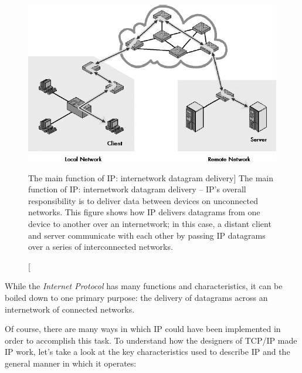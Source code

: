 \begin{figure}
   \centering
   \includegraphics[width=.7\textwidth]{images/ip-main-function.jpg}
   \caption
      [The main function of IP: internetwork datagram delivery]
      {The main function of IP: internetwork datagram delivery --
      IP's overall responsibility is to deliver data between devices on unconnected networks.
      This figure shows how IP delivers datagrams from one device to another over an internetwork;
      in this case, a distant client and server communicate with each other by passing IP datagrams over a series of interconnected networks.}
   \label{fig:ip-main-function}
\end{figure}


\begin{keyconcept}
While the \emph{Internet Protocol} has many functions and characteristics, it can be boiled down to one primary purpose: the delivery of datagrams across an internetwork of connected
networks.
\end{keyconcept}

Of course, there are many ways in which IP could have been implemented in order to accomplish this task.
To understand how the designers of TCP/IP made IP work, let's take a look at the key characteristics used to describe IP and the general manner in which it operates:

